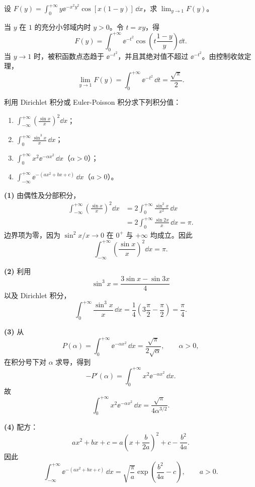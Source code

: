 \begin{xexercise}[6]
设 $F(y)=\displaystyle\int_0^{+\infty}y\ee^{-x^2y^2}\cos[x(1-y)]\,\dd x$，求 $\displaystyle\lim_{y\to1}F(y)$。
\end{xexercise}
\begin{xsolution}
当 $y$ 在 $1$ 的充分小邻域内时 $y>0$。令 $t=xy$，得
\[
F(y)=\int_0^{+\infty}\ee^{-t^2}
\cos\left(t\frac{1-y}{y}\right)\dd t.
\]
当 $y\to1$ 时，被积函数点态趋于 $\ee^{-t^2}$，并且其绝对值不超过 $\ee^{-t^2}$。由控制收敛定理，
\[
\boxed{
\lim_{y\to1}F(y)
=\int_0^{+\infty}\ee^{-t^2}\,\dd t
=\frac{\sqrt\pi}{2}.}
\]
\end{xsolution}


\begin{xexercise}[7]
利用 Dirichlet 积分或 Euler-Poisson 积分求下列积分值：
  \begin{enumerate}[label=(\arabic*)]
    \item $\displaystyle\int_{-\infty}^{+\infty}\left(\frac{\sin x}{x}\right)^2\dd x$；
    \item $\displaystyle\int_0^{+\infty}\frac{\sin^3x}{x}\,\dd x$；
    \item $\displaystyle\int_0^{+\infty}x^2\ee^{-\alpha x^2}\,\dd x$（$\alpha>0$）；
    \item $\displaystyle\int_{-\infty}^{+\infty}\ee^{-(ax^2+bx+c)}\,\dd x$（$a>0$）。
  \end{enumerate}
\end{xexercise}
\begin{xsolution}
\textbf{(1)} 由偶性及分部积分，
\[
\begin{aligned}
\int_{-\infty}^{+\infty}\left(\frac{\sin x}{x}\right)^2\dd x
&=2\int_0^{+\infty}\frac{\sin^2x}{x^2}\,\dd x\\
&=2\int_0^{+\infty}\frac{\sin2x}{x}\,\dd x=\pi.
\end{aligned}
\]
边界项为零，因为 $\sin^2x/x\to0$ 在 $0^+$ 与 $+\infty$ 均成立。因此
\[
\boxed{\displaystyle\int_{-\infty}^{+\infty}
\left(\frac{\sin x}{x}\right)^2\dd x=\pi}.
\]

\textbf{(2)} 利用
\[
\sin^3x=\frac{3\sin x-\sin3x}{4}
\]
以及 Dirichlet 积分，
\[
\boxed{
\int_0^{+\infty}\frac{\sin^3x}{x}\,\dd x
=\frac14\left(3\frac\pi2-\frac\pi2\right)=\frac\pi4.}
\]

\textbf{(3)} 从
\[
P(\alpha)=\int_0^{+\infty}\ee^{-\alpha x^2}\,\dd x
=\frac{\sqrt\pi}{2\sqrt\alpha},
\qquad\alpha>0,
\]
在积分号下对 $\alpha$ 求导，得到
\[
-P'(\alpha)=\int_0^{+\infty}x^2\ee^{-\alpha x^2}\,\dd x.
\]
故
\[
\boxed{
\int_0^{+\infty}x^2\ee^{-\alpha x^2}\,\dd x
=\frac{\sqrt\pi}{4\alpha^{3/2}}.}
\]

\textbf{(4)} 配方：
\[
ax^2+bx+c=a\left(x+\frac b{2a}\right)^2+c-\frac{b^2}{4a}.
\]
因此
\[
\boxed{
\int_{-\infty}^{+\infty}\ee^{-(ax^2+bx+c)}\,\dd x
=\sqrt{\frac\pi a}\exp\left(\frac{b^2}{4a}-c\right),
\qquad a>0.}
\]
\end{xsolution}


